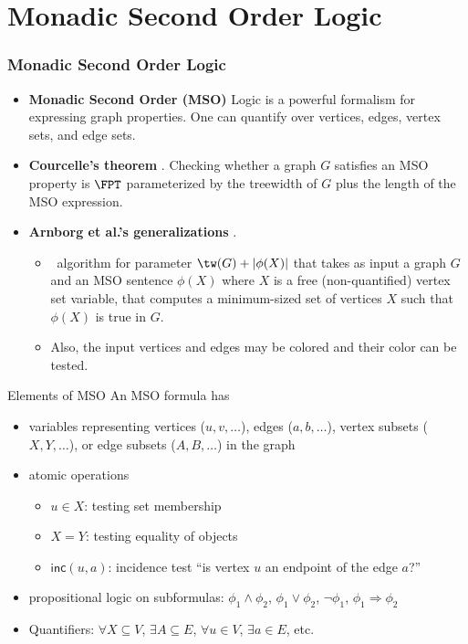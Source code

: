 \section{Monadic Second Order Logic}

\begin{frame}
  \frametitle{Monadic Second Order Logic}
  \begin{itemize}
  \item \textbf{Monadic Second
      Order (MSO)} Logic is a powerful formalism for expressing graph
    properties. One can  quantify over vertices, edges, vertex sets, and edge sets.
    
  \item \textbf{Courcelle's theorem} \cite{Courcelle90}. Checking whether a graph $G$ satisfies an MSO property is $\FPT$
    parameterized by the treewidth of $G$ plus the length of the MSO expression.
  \item \textbf{Arnborg et al.'s generalizations} \cite{ArnborgLS91}.
  \begin{itemize}
  	\item \FPT\ algorithm for parameter $\tw(G)+|\phi(X)|$ that takes as input a graph $G$ and an MSO sentence $\phi(X)$ where $X$ is a free (non-quantified) vertex set variable, that computes a minimum-sized set of vertices $X$ such that $\phi(X)$ is true in $G$.
  	\item Also, the input vertices and edges may be colored and their color can be tested.
  \end{itemize}
\end{itemize}
\end{frame}


\newcommand{\adj}{\ensuremath{\mathsf{adj}}}
\newcommand{\inc}{\ensuremath{\mathsf{inc}}}
\newcommand{\partition}{\ensuremath{\mathsf{partition}}}
\newcommand{\TCOL}{\ensuremath{\mathsf{3COL}}}
\newcommand{\independent}{\ensuremath{\mathsf{independent}}}
\newcommand{\sat}{\ensuremath{\mathsf{sat}}}
\newcommand{\falsifies}{\ensuremath{\mathsf{falsifies}}}


\begin{frame}{Elements of MSO}
 An MSO formula has
 \begin{itemize}
  \item variables representing vertices ($u,v,\dots$), edges ($a,b,\dots$), vertex subsets ($X,Y,\dots$), or edge subsets ($A,B,\dots$) in the graph
  \item atomic operations
   \begin{itemize}
    \item $u\in X$: testing set membership
    \item $X=Y$: testing equality of objects
    \item $\inc(u,a)$: incidence test ``is vertex $u$ an endpoint of the edge $a$?''
   \end{itemize}
  \item propositional logic on subformulas: $\phi_1 \wedge \phi_2$, $\phi_1 \vee \phi_2$, $\neg \phi_1$, $\phi_1 \Rightarrow \phi_2$
  \item Quantifiers: $\forall X \subseteq V$, $\exists A\subseteq E$, $\forall u\in V$, $\exists a\in E$, etc.
 \end{itemize}
\end{frame}

